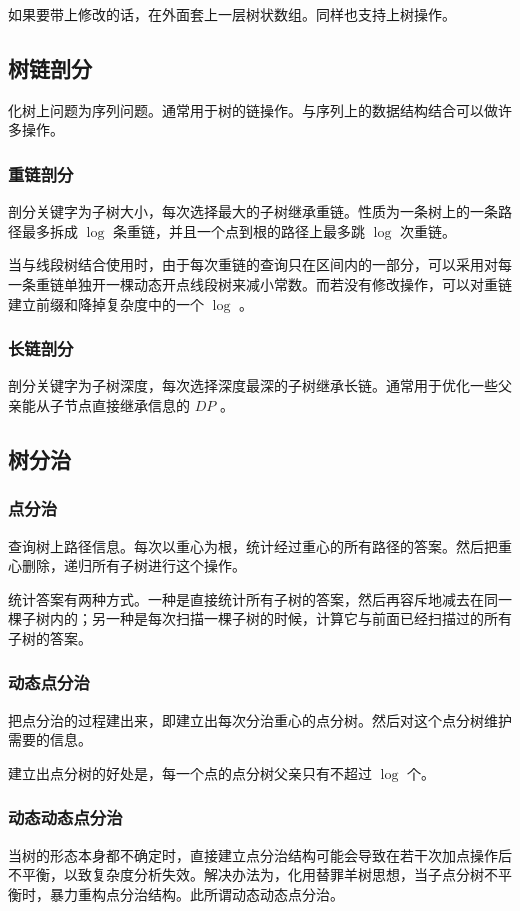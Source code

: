 \documentclass[UTF-8]{ctexart}
\begin{document}
			如果要带上修改的话，在外面套上一层树状数组。同样也支持上树操作。
		\subsection{树链剖分}
			化树上问题为序列问题。通常用于树的链操作。与序列上的数据结构结合可以做许多操作。
	
			\subsubsection{重链剖分}
			剖分关键字为子树大小，每次选择最大的子树继承重链。性质为一条树上的一条路径最多拆成 $\log$ 条重链，并且一个点到根的路径上最多跳 $\log$ 次重链。
	
			当与线段树结合使用时，由于每次重链的查询只在区间内的一部分，可以采用对每一条重链单独开一棵动态开点线段树来减小常数。而若没有修改操作，可以对重链建立前缀和降掉复杂度中的一个 $\log$ 。
			\subsubsection{长链剖分}
			剖分关键字为子树深度，每次选择深度最深的子树继承长链。通常用于优化一些父亲能从子节点直接继承信息的 $DP$ 。
		\subsection{树分治}
			\subsubsection{点分治}
			查询树上路径信息。每次以重心为根，统计经过重心的所有路径的答案。然后把重心删除，递归所有子树进行这个操作。
	
			统计答案有两种方式。一种是直接统计所有子树的答案，然后再容斥地减去在同一棵子树内的；另一种是每次扫描一棵子树的时候，计算它与前面已经扫描过的所有子树的答案。
				\subsubsection{动态点分治}
				把点分治的过程建出来，即建立出每次分治重心的点分树。然后对这个点分树维护需要的信息。
	
				建立出点分树的好处是，每一个点的点分树父亲只有不超过 $\log$ 个。
				\subsubsection{动态动态点分治}
				当树的形态本身都不确定时，直接建立点分治结构可能会导致在若干次加点操作后不平衡，以致复杂度分析失效。解决办法为，化用替罪羊树思想，当子点分树不平衡时，暴力重构点分治结构。此所谓动态动态点分治。
				
\end{document}
